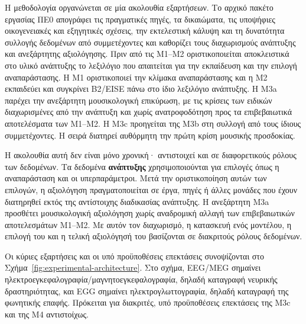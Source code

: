 \documentclass[11pt,a4paper]{article}
\begin{document}
Η μεθοδολογία οργανώνεται σε μία ακολουθία εξαρτήσεων. Το αρχικό πακέτο εργασίας ΠΕ0 απογράφει τις πραγματικές πηγές, τα δικαιώματα, τις υποψήφιες οικογενειακές και εξηγητικές σχέσεις, την εκτελεστική κάλυψη και τη δυνατότητα συλλογής δεδομένων από συμμετέχοντες και καθορίζει τους διαχωρισμούς ανάπτυξης και ανεξάρτητης αξιολόγησης. Πριν από τις M1--M2 οριστικοποιείται αποκλειστικά στο υλικό ανάπτυξης το λεξιλόγιο που απαιτείται για την εκπαίδευση και την επιλογή αναπαράστασης. Η M1 οριστικοποιεί την κλίμακα αναπαράστασης και η M2 εκπαιδεύει και συγκρίνει B2/EISE πάνω στο ίδιο λεξιλόγιο ανάπτυξης. Η M3a παρέχει την ανεξάρτητη μουσικολογική επικύρωση, με τις κρίσεις των ειδικών διαχωρισμένες από την ανάπτυξη και χωρίς ανατροφοδότηση προς τα επιβεβαιωτικά αποτελέσματα των M1--M2. Η M3c προηγείται της M3b στη συλλογή από τους ίδιους συμμετέχοντες. Η σειρά διατηρεί αυθόρμητη την πρώτη κρίση μουσικής προσδοκίας.

Η ακολουθία αυτή δεν είναι μόνο χρονική· αντιστοιχεί και σε διαφορετικούς ρόλους των δεδομένων. Τα δεδομένα \textbf{ανάπτυξης} χρησιμοποιούνται για επιλογές όπως η αναπαράσταση και οι υπερπαράμετροι. Μετά την οριστικοποίηση αυτών των επιλογών, η αξιολόγηση πραγματοποιείται σε έργα, πηγές ή άλλες μονάδες που έχουν διατηρηθεί εκτός της αντίστοιχης διαδικασίας ανάπτυξης. Η ανεξάρτητη M3a προσθέτει μουσικολογική αξιολόγηση χωρίς αναδρομική αλλαγή των επιβεβαιωτικών αποτελεσμάτων M1--M2. Με αυτόν τον διαχωρισμό, η κατασκευή ενός μοντέλου, η επιλογή του και η τελική αξιολόγησή του βασίζονται σε διακριτούς ρόλους δεδομένων.

Οι κύριες εξαρτήσεις και οι υπό προϋποθέσεις επεκτάσεις συνοψίζονται στο Σχήμα~\ref{fig:experimental-architecture}. Στο σχήμα, EEG/MEG σημαίνει ηλεκτροεγκεφαλογραφία/μαγνητοεγκεφαλογραφία, δηλαδή καταγραφή νευρικής δραστηριότητας, και EGG σημαίνει ηλεκτρογλωττογραφία, δηλαδή καταγραφή της φωνητικής επαφής. Πρόκειται για διακριτές, υπό προϋποθέσεις επεκτάσεις της M3c και της M4 αντιστοίχως.
\end{document}
